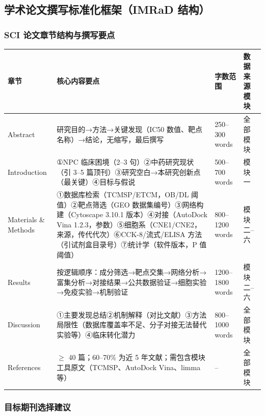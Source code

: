 \documentclass[12pt,a4paper,twoside]{article}
\begin{document}
\subsection{学术论文撰写标准化框架（IMRaD 结构）}
\label{sec:module8_paper}

\subsubsection{SCI 论文章节结构与撰写要点}

\begin{center}
\begin{tabular}{p{2.5cm}p{4cm}p{3cm}p{4cm}}
\toprule
\textbf{章节} & \textbf{核心内容要点} & \textbf{字数范围} & \textbf{数据来源模块} \\
\midrule
Abstract & 研究目的→方法→关键发现（IC50 数值、靶点名称）→结论，无缩写，最后撰写 & 250--300 words & 全部模块 \\
\addlinespace
Introduction & ①NPC 临床困境（2--3 句）②中药研究现状（引 3--5 篇顶刊）③研究空白→本研究创新点（最关键）④目标与假说 & 500--700 words & 模块一 \\
\addlinespace
Materials \& Methods & ①数据库检索（TCMSP/ETCM，OB/DL 阈值）②靶点筛选（GEO 数据集编号）③网络构建（Cytoscape 3.10.1 版本）④对接（AutoDock Vina 1.2.3，参数）⑤细胞系（CNE1/CNE2，来源，传代代次）⑥CCK-8/流式/ELISA 方法（引试剂盒目录号）⑦统计学（软件版本，P 值阈值） & 800--1200 words & 模块二--六 \\
\addlinespace
Results & 按逻辑顺序：成分筛选→靶点交集→网络分析→富集分析→对接结果→公共数据验证→细胞实验→免疫实验→机制验证 & 1200--1800 words & 模块二--六 \\
\addlinespace
Discussion & ①主要发现总结②机制解释（对比文献）③方法局限性（数据库覆盖率不足、分子对接无法替代实验等）④临床转化潜力 & 800--1000 words & 全部模块 \\
\addlinespace
References & $\geq$ 40 篇；60--70\% 为近 5 年文献；需包含模块工具原文（TCMSP、AutoDock Vina、limma 等） & -- & 全部模块 \\
\bottomrule
\end{tabular}
\end{center}

\subsubsection{目标期刊选择建议}
\end{document}
